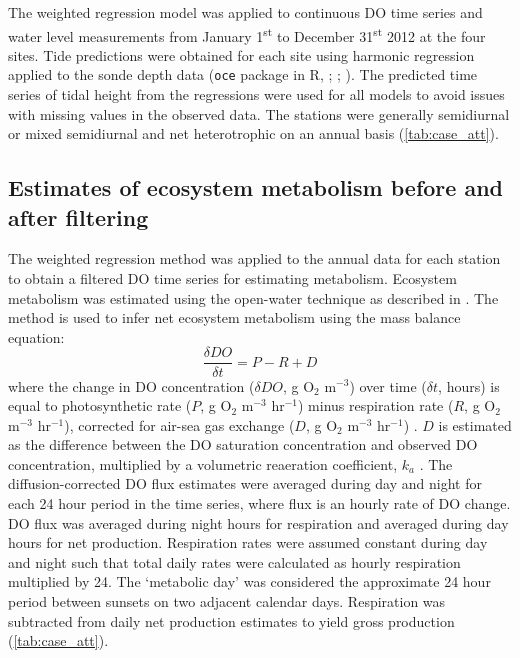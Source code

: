 \documentclass[letterpaper,12pt,oneside]{article}\usepackage[]{graphicx}\usepackage[]{color}
\begin{document}
The weighted regression model was applied to continuous \ac{DO} time series and water level measurements from January 1\textsuperscript{st} to December 31\textsuperscript{st} 2012 at the four sites.  Tide predictions were obtained for each site using harmonic regression applied to the sonde depth data (\texttt{oce} package in R, \citealt{Foreman89}; \citealt{Kelley14}; ). The predicted time series of tidal height from the regressions were used for all models to avoid issues with missing values in the observed data. The stations were generally semidiurnal or mixed semidiurnal and net heterotrophic on an annual basis (\cref{tab:case_att}).

\subsection{Estimates of ecosystem metabolism before and after filtering} \label{met_sec}

The weighted regression method was applied to the annual data for each station to obtain a filtered \ac{DO} time series for estimating metabolism.  Ecosystem metabolism was estimated using the open-water technique \citep{Odum56} as described in \citet{Caffrey14}.  The method is used to infer net ecosystem metabolism using the mass balance equation:
\begin{equation} \label{metrate}
\frac{\delta DO}{\delta t} = P - R + D
\end{equation}
where the change in \ac{DO} concentration ($\delta DO$, g O$_2$ m$^{-3}$) over time ($\delta t$, hours) is equal to photosynthetic rate ($P$, g O$_2$ m$^{-3}$ hr$^{-1}$) minus respiration rate ($R$, g O$_2$ m$^{-3}$ hr$^{-1}$), corrected for air-sea gas exchange ($D$, g O$_2$ m$^{-3}$ hr$^{-1}$) \citep{Caffrey14}. $D$ is estimated as the difference between the \ac{DO} saturation concentration and observed \ac{DO} concentration, multiplied by a volumetric reaeration coefficient, $k_a$ \citep{Thebault08}.  The diffusion-corrected \ac{DO} flux estimates were averaged during day and night for each 24 hour period in the time series, where flux is an hourly rate of \ac{DO} change. \ac{DO} flux was averaged during night hours for respiration and averaged during day hours for net production. Respiration rates were assumed constant during day and night such that total daily rates were calculated as hourly respiration multiplied by 24. The `metabolic day' was considered the approximate 24 hour period between sunsets on two adjacent calendar days.  Respiration was subtracted from daily net production estimates to yield gross production (\cref{tab:case_att}).  
\end{document}
